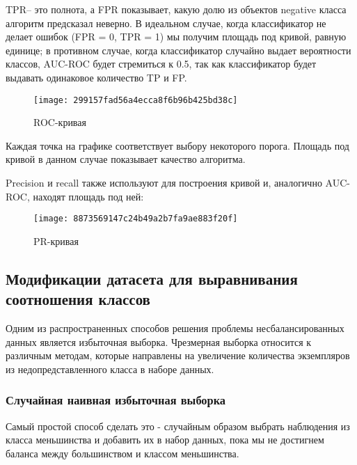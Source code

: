 \documentclass{article}
\begin{document}
	TPR-- это полнота, а FPR показывает, какую долю из объектов negative класса алгоритм предсказал неверно. В идеальном случае, когда классификатор не делает ошибок (FPR = 0, TPR = 1) мы получим площадь под кривой, равную единице; в противном случае, когда классификатор случайно выдает вероятности классов, AUC-ROC будет стремиться к 0.5, так как классификатор будет выдавать одинаковое количество TP и FP.
	
	\begin{figure}[hhh!]
		\begin{center}
			\texttt{[image: 299157fad56a4ecca8f6b96b425bd38c]}
		\end{center}
		\vspace{-5mm}\caption{ROC-кривая}
	\end{figure}
	
	Каждая точка на графике соответствует выбору некоторого порога. Площадь под кривой в данном случае показывает качество алгоритма.
	
	Precision и recall также используют для построения кривой и, аналогично AUC-ROC, находят площадь под ней:
	
	\begin{figure}[hhh!]
		\begin{center}
			\texttt{[image: 8873569147c24b49a2b7fa9ae883f20f]}
		\end{center}
		\vspace{-5mm}\caption{PR-кривая}
	\end{figure}
	
	\subsection{Модификации датасета для выравнивания соотношения классов}
	
	Одним из распространенных способов решения проблемы несбалансированных данных является избыточная выборка. Чрезмерная выборка относится к различным методам, которые направлены на увеличение количества экземпляров из недопредставленного класса в наборе данных.
	
	\subsubsection{Случайная наивная избыточная выборка}
	
	Самый простой способ сделать это - случайным образом выбрать наблюдения из класса меньшинства и добавить их в набор данных, пока мы не достигнем баланса между большинством и классом меньшинства. 
	
\end{document}
